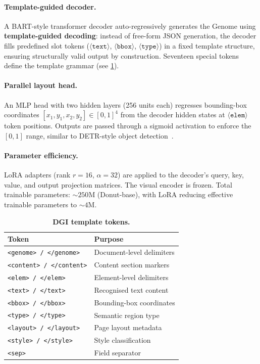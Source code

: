\documentclass[conference]{IEEEtran}
\begin{document}
\paragraph{Template-guided decoder.}
A BART-style transformer decoder auto-regressively generates the Genome using
\textbf{template-guided decoding}: instead of free-form JSON generation, the decoder
fills predefined slot tokens
($\langle\texttt{text}\rangle$, $\langle\texttt{bbox}\rangle$,
$\langle\texttt{type}\rangle$) in a fixed template structure, ensuring structurally
valid output by construction.  Seventeen special tokens define the template grammar
(see \cref{tab:tokens}).

\paragraph{Parallel layout head.}
An MLP head with two hidden layers (256 units each) regresses bounding-box coordinates
$[x_1, y_1, x_2, y_2] \in [0,1]^4$ from the decoder hidden states at
$\langle\texttt{elem}\rangle$ token positions.  Outputs are passed through a sigmoid
activation to enforce the $[0,1]$ range, similar to DETR-style object
detection~\cite{carion2020detr}.

\paragraph{Parameter efficiency.}
LoRA adapters (rank $r{=}16$, $\alpha{=}32$) are applied to the decoder's query, key,
value, and output projection matrices.  The visual encoder is frozen.  Total trainable
parameters: ${\sim}250$M (Donut-base), with LoRA reducing effective trainable
parameters to ${\sim}4$M.

\begin{table}[t]
  \centering
  \small
  \caption{\textbf{DGI template tokens.}}
  \label{tab:tokens}
  \begin{tabular}{ll}
    \toprule
    \textbf{Token} & \textbf{Purpose} \\
    \midrule
    \texttt{<genome> / </genome>}   & Document-level delimiters \\
    \texttt{<content> / </content>} & Content section markers \\
    \texttt{<elem> / </elem>}       & Element-level delimiters \\
    \texttt{<text> / </text>}       & Recognised text content \\
    \texttt{<bbox> / </bbox>}       & Bounding-box coordinates \\
    \texttt{<type> / </type>}       & Semantic region type \\
    \texttt{<layout> / </layout>}   & Page layout metadata \\
    \texttt{<style> / </style>}     & Style classification \\
    \texttt{<sep>}                  & Field separator \\
    \bottomrule
  \end{tabular}
\end{table}
\end{document}
